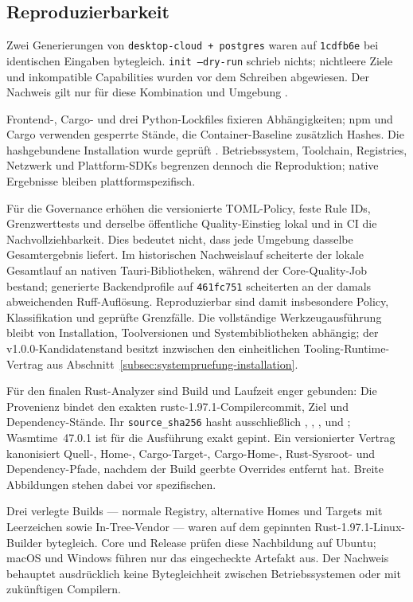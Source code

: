 \subsection{Reproduzierbarkeit}
\label{subsec:reproduzierbarkeit}

Zwei Generierungen von \texttt{desktop-cloud + postgres} waren auf
\texttt{1cdfb6e} bei identischen Eingaben bytegleich. \texttt{init --dry-run}
schrieb nichts; nichtleere Ziele und inkompatible Capabilities wurden vor dem
Schreiben abgewiesen. Der Nachweis gilt nur für diese Kombination und Umgebung
\parencite{kleiveist2026acceptance,lamb2022reproducible-builds}.

Frontend-, Cargo- und drei Python-Lockfiles fixieren Abhängigkeiten; npm und
Cargo verwenden gesperrte Stände, die Container-Baseline zusätzlich Hashes.
Die hashgebundene Installation wurde geprüft
\parencite{kleiveist2026ci,kleiveist2026container}. Betriebssystem, Toolchain,
Registries, Netzwerk und Plattform-SDKs begrenzen dennoch die Reproduktion;
native Ergebnisse bleiben plattformspezifisch.

Für die Governance erhöhen die versionierte TOML-Policy, feste Rule IDs,
Grenzwerttests und derselbe öffentliche Quality-Einstieg lokal und in CI die
Nachvollziehbarkeit. Dies bedeutet nicht, dass jede Umgebung dasselbe
Gesamtergebnis liefert. Im historischen Nachweislauf scheiterte der lokale
Gesamtlauf an nativen Tauri-Bibliotheken, während der Core-Quality-Job bestand;
generierte Backendprofile auf \texttt{461fc751} scheiterten an der damals
abweichenden Ruff-Auflösung. Reproduzierbar sind damit insbesondere Policy,
Klassifikation und geprüfte Grenzfälle. Die vollständige Werkzeugausführung
bleibt von Installation, Toolversionen und Systembibliotheken abhängig; der
v1.0.0-Kandidatenstand besitzt inzwischen den einheitlichen
Tooling-Runtime-Vertrag aus
Abschnitt~\ref{subsec:systempruefung-installation}.

Für den finalen Rust-Analyzer sind Build und Laufzeit enger gebunden: Die
Provenienz bindet den exakten rustc-1.97.1-Compilercommit, Ziel und
Dependency-Stände. Ihr \texttt{source\_sha256} hasht ausschließlich
, , ,
 und ; Wasmtime~47.0.1 ist für die
Ausführung exakt gepint. Ein versionierter Vertrag kanonisiert Quell-, Home-,
Cargo-Target-, Cargo-Home-, Rust-Sysroot- und Dependency-Pfade, nachdem der
Build geerbte Overrides entfernt hat. Breite Abbildungen stehen dabei vor
spezifischen.

Drei verlegte Builds --- normale Registry, alternative Homes und Targets mit
Leerzeichen sowie In-Tree-Vendor --- waren auf dem gepinnten
Rust-1.97.1-Linux-Builder bytegleich. Core und Release prüfen diese Nachbildung
auf Ubuntu; macOS und Windows führen nur das eingecheckte Artefakt aus. Der
Nachweis behauptet ausdrücklich keine Bytegleichheit zwischen Betriebssystemen
oder mit zukünftigen Compilern.
